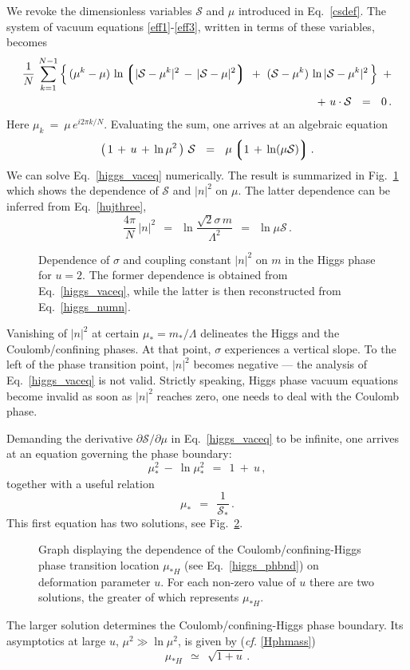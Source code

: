 \documentclass[epsfig,12pt]{article}
\def\beq{\begin{equation}}
\def\eeq{\end{equation}}
\newcommand{\cs}{{\mathcal S}}
\def\beq{\begin{equation}}
\def\eeq{\end{equation}}
\newcommand{\p}{\partial}
\newcommand{\lgr}{\left\lgroup}
\newcommand{\rgr}{\right\rgroup}
\begin{document}
{We revoke the dimensionless variables $ \cs $ and $ \mu $ introduced in Eq.~\eqref{csdef}.
The system of vacuum equations \eqref{eff1}-\eqref{eff3}, written in terms of these variables, becomes
\begin{align}
%
\notag
	\frac{1}{N}\,\sum_{k=1}^{N-1}  \left\{\,  (\mu^k - \mu)\, 
			                          \ln \lgr |\cs - \mu^k |^2  \,-\, |\cs - \mu |^2 \rgr 
                         			   ~+~ (\cs - \mu^k)\, \ln |\cs - \mu^k | ^2 \,\right\} ~+ \\
%
                              ~+~ u\cdot \cs ~~=~~ 0\,.
\end{align}
Here $ \mu_k ~=~ \mu\, e^{i2\pi k / N} $.
Evaluating the sum, one arrives at an algebraic equation
\beq
\label{higgs_vaceq}
	\left(\, 1 \,+\, u \,+\, \ln \mu^2 \,\right)\, \cs  ~~=~~ \mu \lgr 1 \,+\, \ln(\mu \cs) \rgr .
\eeq
We can solve Eq.~\eqref{higgs_vaceq} numerically. 
The result is summarized in Fig.~\ref{fig:numsignm} which shows the dependence of $ \cs $ and $ |n|^2 $ on $\mu$.
The latter dependence can be inferred from Eq.~\eqref{hujthree},
\beq
\label{higgs_numn}
	\frac{4\pi}{N}\, |n|^2 ~~=~~ \ln \frac{\sqrt{2}\sigma\, m}{\Lambda^2}
		~~=~~ \ln \mu\cs \,.
\eeq 
\begin{figure}
\epsfxsize=11cm
\centerline{}
\caption{\small Dependence of $\sigma$ and coupling constant $|n|^2$ on $m$ in the Higgs phase for $u = 2$.
The former dependence is obtained from Eq.~\eqref{higgs_vaceq}, while the latter is then reconstructed from
Eq.~\eqref{higgs_numn}.}
\label{fig:numsignm}
\end{figure}
Vanishing of $ |n|^2 $ at certain $ \mu_* = m_*/\Lambda $ delineates the Higgs and the Coulomb/confining phases.
At that point, $\sigma$ experiences a vertical slope. 
To the left of the phase transition point, $ |n|^2 $ becomes negative --- 
the analysis of Eq.~\eqref{higgs_vaceq} is not valid.
Strictly speaking, Higgs phase vacuum equations become invalid as soon as $|n|^2$ reaches zero,
one needs to deal with the Coulomb phase. 

Demanding the derivative $ \p\cs/\p\mu $ in Eq.~\eqref{higgs_vaceq} to be infinite, 
one arrives at an equation governing the phase boundary:
\beq
\label{higgs_phbnd}
	\mu_*^2 ~-~ \ln \mu_*^2 ~~=~~ 1 ~+~ u\,,
\eeq
together with a useful relation
\beq
\label{higgs_cs}
	\mu_* ~~=~~ \frac{1}{\cs_*}\,.
\eeq
This first equation has two solutions, see Fig.~\ref{fig:higgsborder}.
\begin{figure}
\epsfxsize=11cm
\centerline{}
\caption{\small 
Graph displaying the dependence of the Coulomb/confining-Higgs phase transition location $\mu_{*H}$
(see Eq.~\eqref{higgs_phbnd}) on deformation parameter $u$. 
For each non-zero value of $u$ there are two solutions, the greater of which represents $\mu_{*H}$.}
\label{fig:higgsborder}
\end{figure}
The larger solution determines the Coulomb/confining-Higgs phase boundary. Its asymptotics at large $u$,
$ \mu^2 \gg \ln \mu^2 $, is given by ({\it cf.} \eqref{Hphmass})
\beq
	\mu_{*H} ~~\simeq~~ \sqrt{ 1 + u }\,.
\eeq

}
\end{document}
